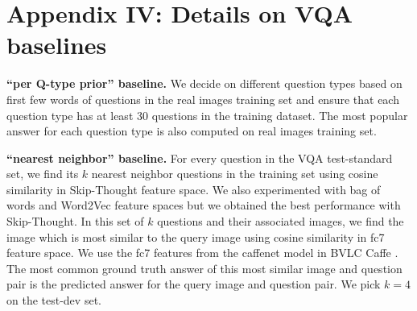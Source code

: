 
\section*{Appendix IV: Details on VQA baselines}
\label{sec:baselines}
\textbf{``per Q-type prior'' baseline.} We decide on different question types based on first few words of questions in the real images training set and ensure that each question type has at least 30 questions in the training dataset. The most popular answer for each question type is also computed on real images training set. 

\textbf{``nearest neighbor'' baseline.} For every question in the VQA test-standard set, we find its $k$ nearest neighbor questions in the training set using cosine similarity in Skip-Thought \cite{kiros2015skip} feature space. We also experimented with bag of words and Word2Vec \cite{word2vec} feature spaces but we obtained the best performance with Skip-Thought. In this set of $k$ questions and their associated images, we find the image which is most similar to the query image using cosine similarity in fc7 feature space. We use the fc7 features from the caffenet model in BVLC Caffe \cite{jia2014caffe}. The most common ground truth answer of this most similar image and question pair is the predicted answer for the query image and question pair. We pick $k = 4$ on the test-dev set.

